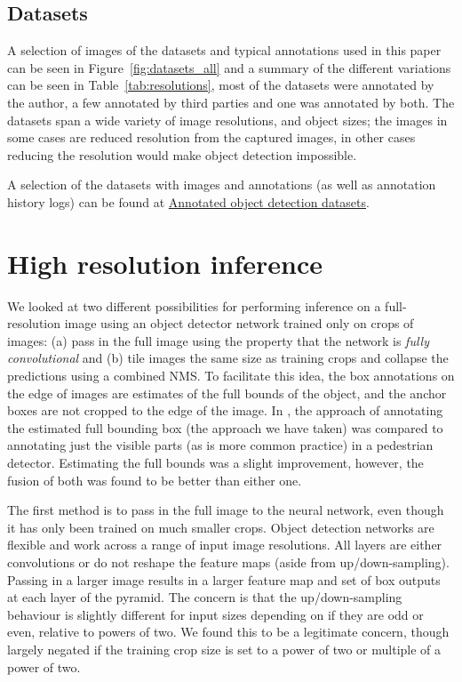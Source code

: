 \documentclass[conference]{IEEEtran}
\begin{document}
\subsection{Datasets}

A selection of images of the datasets and typical annotations used in this paper can be seen in Figure~\ref{fig:datasets_all} and a summary of the different variations can be seen in Table~\ref{tab:resolutions}, most of the datasets were annotated by the author, a few annotated by third parties and one was annotated by both. The datasets span a wide variety of image resolutions, and object sizes; the images in some cases are reduced resolution from the captured images, in other cases reducing the resolution would make object detection impossible.

A selection of the datasets with images and annotations (as well as annotation history logs) can be found at \href{http://academictorrents.com/details/e780e1a9e898e53e72c16cb5fcc6d61d90cc4d27}{Annotated object detection datasets}. 

\section{High resolution inference}

We looked at two different possibilities for performing inference on a full-resolution image using an object detector network trained only on crops of images: (a) pass in the full image using the property that the network is \emph{fully convolutional} and (b) tile images the same size as training crops and collapse the predictions using a combined \gls{NMS}. To facilitate this idea, the box annotations on the edge of images are estimates of the full bounds of the object, and the anchor boxes are not cropped to the edge of the image. In \cite{Duarte2010}, the approach of annotating the estimated full bounding box (the approach we have taken) was compared to annotating just the visible parts (as is more common practice) in a pedestrian detector. Estimating the full bounds was a slight improvement, however, the fusion of both was found to be better than either one. 

The first method is to pass in the full image to the neural network, even though it has only been trained on much smaller crops. Object detection networks are flexible and work across a range of input image resolutions. All layers are either convolutions or do not reshape the feature maps (aside from up/down-sampling). Passing in a larger image results in a larger feature map and set of box outputs at each layer of the pyramid. The concern is that the up/down-sampling behaviour is slightly different for input sizes depending on if they are odd or even, relative to powers of two. We found this to be a legitimate concern, though largely negated if the training crop size is set to a power of two or multiple of a power of two. 
\end{document}
